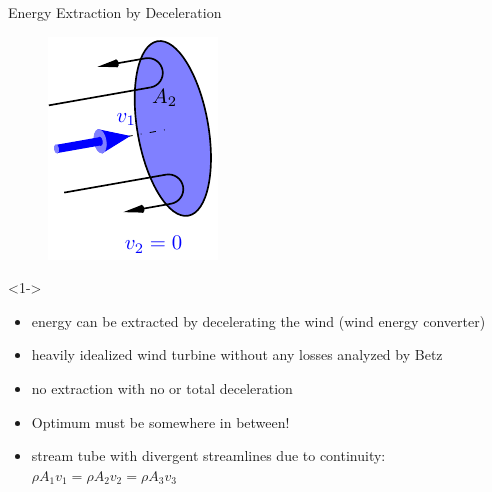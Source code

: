 \begin{frame}{Energy Extraction by Deceleration}
\begin{figure}[htbp]
\begin{center}
\begin{minipage}[c]{0.15\linewidth}
			\includegraphics[width=\linewidth]{WEN/streamtube3.pdf}
		\end{minipage}
	\end{center}
\end{figure}
\begin{block}<1->{}
\begin{itemize}
	\item energy can be extracted by decelerating the wind (wind energy converter)
	\item heavily idealized wind turbine without any losses analyzed by Betz
	\item no extraction with no or total deceleration
	\item <2-> Optimum must be somewhere in between!
	\item <2-> stream tube with divergent streamlines due to continuity: $\rho A_1 v_1= \rho A_2 v_2= \rho A_3 v_3$
\end{itemize}
\end{block}	 
\end{frame}
